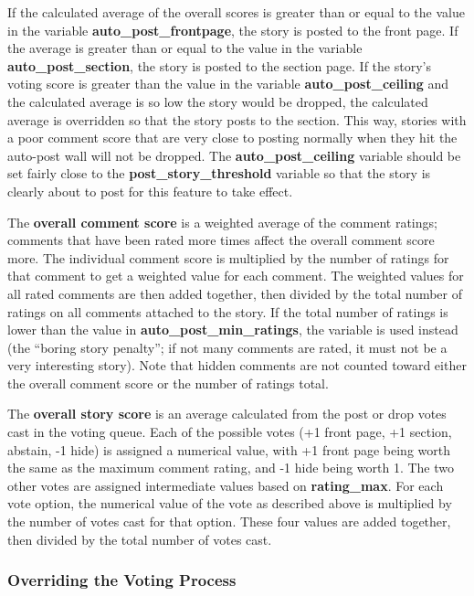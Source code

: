 If the calculated average of the overall scores is greater than or equal to the value in the variable {\bf auto\_post\_frontpage}, the story is posted to the front page.  If the average is greater than or equal to the value in the variable {\bf auto\_post\_section}, the story is posted to the section page.  If the story's voting score is greater than the value in the variable {\bf auto\_post\_ceiling} and the calculated average is so low the story would be dropped, the calculated average is overridden so that the story posts to the section.  This way, stories with a poor comment score that are very close to posting normally when they hit the auto-post wall will not be dropped.  The {\bf auto\_post\_ceiling} variable should be set fairly close to the {\bf post\_story\_threshold} variable so that the story is clearly about to post for this feature to take effect.

The {\bf overall comment score} is a weighted average of the comment ratings; comments that have been rated more times affect the overall comment score more.  The individual comment score is multiplied by the number of ratings for that comment to get a weighted value for each comment.  The weighted values for all rated comments are then added together, then divided by the total number of ratings on all comments attached to the story.  If the total number of ratings is lower than the value in {\bf auto\_post\_min\_ratings}, the variable is used instead (the ``boring story penalty''; if not many comments are rated, it must not be a very interesting story).  Note that hidden comments are not counted toward either the overall comment score or the number of ratings total.

The {\bf overall story score} is an average calculated from the post or drop votes cast in the voting queue.  Each of the possible votes (+1 front page, +1 section, abstain, -1 hide) is assigned a numerical value, with +1 front page being worth the same as the maximum comment rating, and -1 hide being worth 1.  The two other votes are assigned intermediate values based on {\bf rating\_max}.  For each vote option, the numerical value of the vote as described above is multiplied by the number of votes cast for that option.  These four values are added together, then divided by the total number of votes cast.

\subsubsection{Overriding the Voting Process}
\label{moderation-override}

